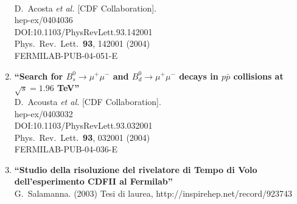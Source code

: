 \documentclass{article}
\begin{document}
\begin{enumerate}
  \\{}D.~Acosta {\it et al.} [CDF Collaboration].
  \\{}hep-ex/0404036
  \\{}DOI:10.1103/PhysRevLett.93.142001
  \\{}Phys.\ Rev.\ Lett.\  {\bf 93}, 142001 (2004)
  \\{}FERMILAB-PUB-04-051-E
\item%
{\bf ``Search for $B_s^0 \to \mu^+ \mu^-$ and $B_d^0 \to \mu^+ \mu^-$ decays in $p\bar{p}$ collisions at $\sqrt{s} = 1.96$ TeV''}
  \\{}D.~Acousta {\it et al.} [CDF Collaboration].
  \\{}hep-ex/0403032
  \\{}DOI:10.1103/PhysRevLett.93.032001
  \\{}Phys.\ Rev.\ Lett.\  {\bf 93}, 032001 (2004)
  \\{}FERMILAB-PUB-04-036-E
\item%
{\bf ``Studio della risoluzione del rivelatore di Tempo di Volo dell'esperimento CDFII al Fermilab''}
  \\{}G.~Salamanna. (2003) Tesi di laurea, http://inspirehep.net/record/923743


\end{enumerate}
\end{document}
